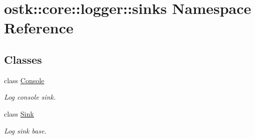 \hypertarget{namespaceostk_1_1core_1_1logger_1_1sinks}{}\section{ostk\+:\+:core\+:\+:logger\+:\+:sinks Namespace Reference}
\label{namespaceostk_1_1core_1_1logger_1_1sinks}
\subsection*{Classes}
\begin{DoxyCompactItemize}
\item 
class \hyperlink{classostk_1_1core_1_1logger_1_1sinks_1_1_console}{Console}
\begin{DoxyCompactList}\small\item\em Log console sink. \end{DoxyCompactList}\item 
class \hyperlink{classostk_1_1core_1_1logger_1_1sinks_1_1_sink}{Sink}
\begin{DoxyCompactList}\small\item\em Log sink base. \end{DoxyCompactList}\end{DoxyCompactItemize}
